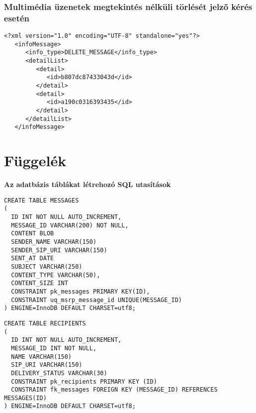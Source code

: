 \subsubsection*{Multimédia üzenetek megtekintés nélküli törlését jelző kérés esetén}
\fontsize{10}{10}
\begin{verbatim}
<?xml version="1.0" encoding="UTF-8" standalone="yes"?>
   <infoMessage>
      <info_type>DELETE_MESSAGE</info_type>
      <detailList>
         <detail>
            <id>b807dc87433043d</id>
         </detail>
         <detail>
            <id>a190c0316393435</id>
         </detail>
      </detailList>
   </infoMessage>
\end{verbatim}
\fontsize{12}{12} 
\newpage 

\section{Függelék}
\label{sec:sql_utasitasok_fuggelek}

\noindent
{\bf Az adatbázis táblákat létrehozó SQL utasítások}

\fontsize{10}{10}
\begin{verbatim}
CREATE TABLE MESSAGES
(
  ID INT NOT NULL AUTO_INCREMENT,
  MESSAGE_ID VARCHAR(200) NOT NULL,
  CONTENT BLOB
  SENDER_NAME VARCHAR(150)
  SENDER_SIP_URI VARCHAR(150)
  SENT_AT DATE
  SUBJECT VARCHAR(250)
  CONTENT_TYPE VARCHAR(50),
  CONTENT_SIZE INT
  CONSTRAINT pk_messages PRIMARY KEY(ID),
  CONSTRAINT uq_msrp_message_id UNIQUE(MESSAGE_ID)
) ENGINE=InnoDB DEFAULT CHARSET=utf8;
\end{verbatim}
\fontsize{12}{12}

\fontsize{10}{10}
\begin{verbatim}
CREATE TABLE RECIPIENTS
(
  ID INT NOT NULL AUTO_INCREMENT,
  MESSAGE_ID INT NOT NULL,
  NAME VARCHAR(150)
  SIP_URI VARCHAR(150)
  DELIVERY_STATUS VARCHAR(30)
  CONSTRAINT pk_recipients PRIMARY KEY (ID)
  CONSTRAINT fk_messages FOREIGN KEY (MESSAGE_ID) REFERENCES MESSAGES(ID)
) ENGINE=InnoDB DEFAULT CHARSET=utf8;
\end{verbatim}
\fontsize{12}{12}